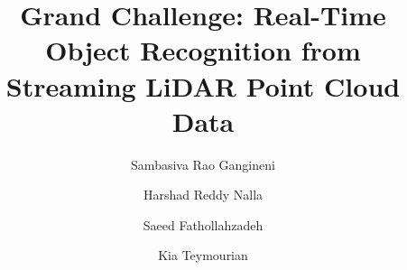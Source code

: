 \documentclass[sigconf]{acmart}
\begin{document}
%

\title{Grand Challenge: Real-Time Object Recognition from Streaming LiDAR Point Cloud Data}


%


\author{Sambasiva Rao Gangineni}

\author{Harshad Reddy Nalla}


\author{Saeed Fathollahzadeh}

\author{Kia Teymourian}



%
\renewcommand{\shortauthors}{Gangineni, et al.}
\end{document}

